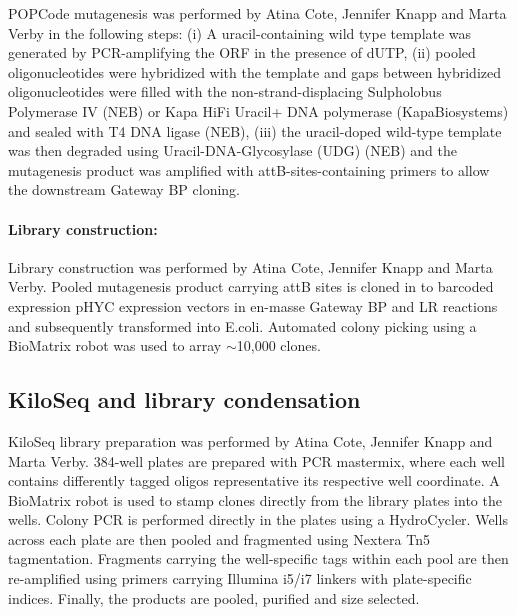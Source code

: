 POPCode mutagenesis was performed by Atina Cote, Jennifer Knapp and Marta Verby in the following steps: (i) A uracil-containing wild type template was generated by PCR-amplifying the ORF in the presence of dUTP, (ii) pooled oligonucleotides were hybridized with the template and gaps between hybridized oligonucleotides were filled with the non-strand-displacing Sulpholobus Polymerase IV (NEB) or Kapa HiFi Uracil+ DNA polymerase (KapaBiosystems) and sealed with T4 DNA ligase (NEB), (iii) the uracil-doped wild-type template was then degraded using Uracil-DNA-Glycosylase (UDG) (NEB) and the mutagenesis product was amplified with attB-sites-containing primers to allow the downstream Gateway BP cloning.

\paragraph{Library construction:} Library construction was performed by Atina Cote, Jennifer Knapp and Marta Verby. Pooled mutagenesis product carrying attB sites is cloned in to barcoded expression pHYC expression vectors in en-masse Gateway BP and LR reactions and subsequently transformed into E.coli. Automated colony picking using a BioMatrix robot was used to array $\sim$10,000 clones.

\subsection{KiloSeq and library condensation}

KiloSeq library preparation was performed by Atina Cote, Jennifer Knapp and Marta Verby. 384-well plates are prepared with PCR mastermix, where each well contains differently tagged oligos representative its respective well coordinate. A BioMatrix robot is used to stamp clones directly from the library plates into the wells. Colony PCR is performed directly in the plates using a HydroCycler. Wells across each plate are then pooled and fragmented using Nextera Tn5 tagmentation. Fragments carrying the well-specific tags within each pool are then re-amplified using primers carrying Illumina i5/i7 linkers with plate-specific indices. Finally, the products are pooled, purified and size selected.



